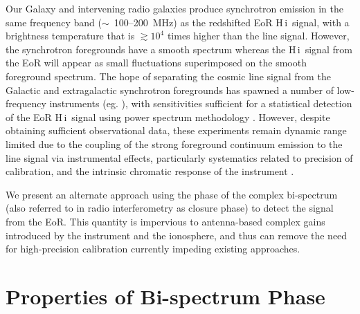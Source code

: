 \documentclass[
reprint,
superscriptaddress,
amsmath,
amssymb,
aps,
prd
]{revtex4-1}
\newcommand{\HI}{H\,{\sc i}}
\begin{document}
Our Galaxy and intervening radio galaxies produce synchrotron emission in the same frequency band ($\sim$~100--200~MHz) as the redshifted EoR \HI\ signal, with a brightness temperature that is $\gtrsim 10^4$ times higher than the line signal. However, the synchrotron foregrounds have a smooth spectrum whereas the \HI\ signal from the EoR will appear as small fluctuations superimposed on the smooth foreground spectrum. The hope of separating the cosmic line signal from the Galactic and extragalactic synchrotron foregrounds has spawned a number of low-frequency instruments (eg. \cite{par10,tin13,van13}), with sensitivities sufficient for a statistical detection of the EoR \HI\ signal using power spectrum methodology \cite{bea13,thy13}.  However, despite obtaining sufficient observational data, these experiments remain dynamic range limited due to the coupling of the strong foreground continuum emission to the line signal via instrumental effects, particularly systematics related to precision of calibration, and the intrinsic chromatic response of the instrument \cite{barry16, thy15a, thy15b, thy16,dat09,dat10,tro16, pac13,ali15,patil17, pob15, liu10,zhe14,sie17,dil17}. 

We present an alternate approach using the phase of the complex bi-spectrum (also referred to in radio interferometry as closure phase) to detect the signal from the EoR. This quantity is impervious to antenna-based complex gains introduced by the instrument and the ionosphere, and thus can remove the need for high-precision calibration currently impeding existing approaches\cite{car16}.

\section{Properties of Bi-spectrum Phase}\label{sec:CPinfo}
\end{document}
